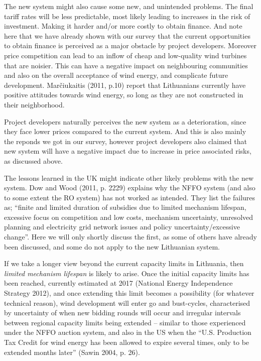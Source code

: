 \documentclass[a4paper, 12pt]{article}
\begin{document}
The new system might also cause some new, and unintended problems. The final tariff rates will be less predictable, most likely leading to increases in the risk of investment. Making it harder and/or more costly to obtain finance. And note here that we have already shown with our survey that the current opportunities to obtain finance is perceived as a major obstacle by project developers. Moreover price competition can lead to an inflow of cheap and low-quality wind turbines that are noisier. This can have a negative impact on neighbouring communities and also on the overall acceptance of wind energy, and complicate future development. Marčiukaitis (2011, p.10) report that Lithuanians currently have positive attitudes towards wind energy, so long as they are not constructed in their neighborhood. 

Project developers naturally perceives the new system as a deterioration, since they face lower prices compared to the current system. And this is also mainly the reponds we got in our survey, however project developers also claimed that new system will have a negative impact due to increase in price associated risks, as discussed above. 

The lessons learned in the UK might indicate other likely problems with the new system. Dow and Wood (2011, p. 2229) explains why the NFFO system (and also to some extent the RO system) has not worked as intended. They list the failures as; ``finite and limited duration of subsidies due to limited mechanism lifespan, excessive focus on competition and low costs, mechanism uncertainty, unresolved planning and electricity grid network issues and policy uncertainty/excessive change''. Here we will only shortly discuss the first, as some of others have already been discussed, and some do not apply to the new Lithuanian system. 

If we take a longer view beyond the current capacity limits in Lithuania, then \emph{limited mechanism lifespan} is likely to arise. Once the initial capacity limits has been reached, currently estimated at 2017 (National Energy Independence Strategy 2012), and once extending this limit becomes a possibility (for whatever technical reason), wind development will enter go and bust-cycles, characterised by uncertainty of when new bidding rounds will occur and irregular intervals between regional capacity limits being extended – similar to those experienced under the NFFO auction system, and also in the US when the ``U.S. Production Tax Credit for wind energy has been allowed to expire several times, only to be extended months later'' (Sawin 2004, p. 26). 
\end{document}
